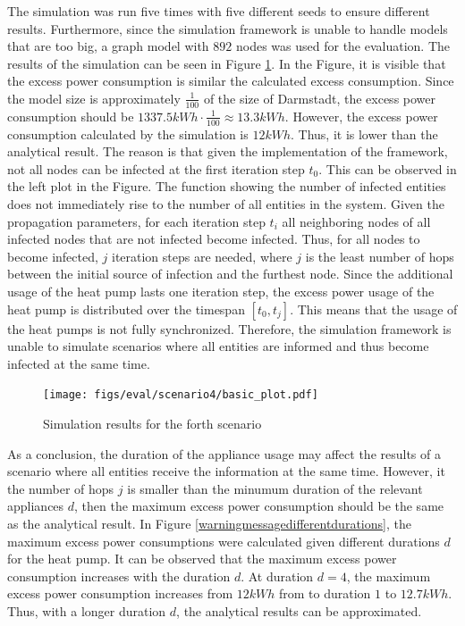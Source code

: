 The simulation was run five times with five 
different seeds to ensure different results. 
Furthermore, since the simulation framework is unable
to handle models that are too big, a graph model with 
$892$ nodes was used for the evaluation. 
The results of the simulation can be seen in 
Figure \ref{warningmessagesimulations}.
In the Figure, it is visible that the excess power 
consumption is similar the calculated excess
consumption. Since the model size is approximately
$\frac{1}{100}$ of the size of Darmstadt, the 
excess power consumption should be
$1337.5 kWh\cdot \frac{1}{100} \approx 13.3 kWh $.
However, the excess power consumption 
calculated by the simulation is $12 kWh$.
Thus, it is lower than the analytical result.
The reason is that given the implementation of the 
framework, not all nodes can be infected at the first
iteration step $t_0$. This can be observed in the 
left plot in the Figure. The function showing the 
number of infected entities does not immediately
rise to the number of all entities in the system.
Given the propagation 
parameters, for each iteration step $t_{i}$ all
neighboring nodes of all infected nodes that
are not infected become infected. Thus, for 
all nodes to become infected, $j$ iteration steps 
are needed, where $j$ is the least number of hops between 
the initial source of infection and the furthest 
node. Since the additional usage of the heat pump 
lasts one iteration step, the excess power usage
of the heat pump is distributed over 
the timespan $[t_0, t_j]$. 
This means that the 
usage of the heat pumps is not fully synchronized.
Therefore, the simulation framework is unable
to simulate scenarios where all entities 
are informed and thus become infected at the 
same time. 


\begin{figure}[!ht]
    \center
    \texttt{[image: figs/eval/scenario4/basic\_plot.pdf]}
    \caption{Simulation results for the forth scenario}
    \label{warningmessagesimulations}
\end{figure}

As a conclusion, the duration of the appliance 
usage may affect the results of a scenario where 
all entities receive the information at the same time.
However, it the number of hops $j$ is smaller than
the minumum duration of the relevant appliances $d$,
then the maximum excess power consumption should 
be the same as the analytical result. 
In Figure \ref{warningmessagedifferentdurations},
the maximum excess power consumptions were calculated
given different durations $d$ for the heat pump.
It can be observed that the maximum excess power 
consumption increases with the duration $d$.
At duration $d=4$, the maximum excess power consumption
increases from $12kWh$ from to duration $1$ to 
$12.7kWh$. Thus, with a longer duration $d$, the 
analytical results can be approximated.

